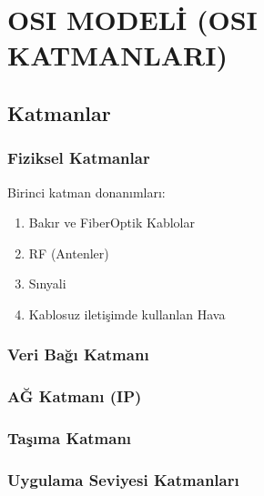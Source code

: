 \section{OSI MODELİ (OSI KATMANLARI)}

\subsection{Katmanlar}

\subsubsection{Fiziksel Katmanlar}

Birinci katman donanımları:
\begin{enumerate}
\item Bakır ve FiberOptik Kablolar
\item RF (Antenler)
\item Sınyali 
\item Kablosuz iletişimde kullanlan Hava 
\end{enumerate}

\subsubsection{Veri Bağı Katmanı}


\subsubsection{AĞ Katmanı (IP) }

\subsubsection{Taşıma Katmanı}

\subsubsection{Uygulama Seviyesi Katmanları}

